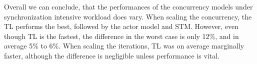%
Overall we can conclude, that the performances of the concurrency models under synchronization intensive workload does vary. When scaling the concurrency, the \ac{TL} performs the best, followed by the actor model and \ac{STM}. However, even though \ac{TL} is the fastest, the difference in the worst case is only 12\%, and in average 5\% to 6\%. When scaling the iterations, \ac{TL} was on average marginally faster, although the difference is negligible unless performance is vital.
%


\worksheetend